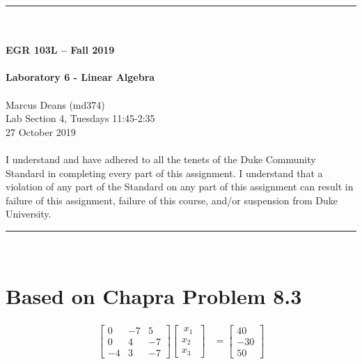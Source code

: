 \documentclass{article}
\begin{document}
\begin{center}
\rule{6.5in}{0.5mm}\\~\\
\textbf{\large EGR 103L -- Fall 2019}\\~\\
\textbf{\huge Laboratory 6 - Linear Algebra}\\~\\
Marcus Deans (md374)\\
Lab Section 4, Tuesdays 11:45-2:35\\
27 October 2019\\~\\
{\small I understand and have adhered to all the tenets of the Duke
  Community Standard in completing every part of this assignment.  I
  understand that a violation of any part of the Standard on any part
  of this assignment can result in failure of this assignment, failure
  of this course, and/or suspension from Duke University.} 
\rule{6.5in}{0.5mm}\\
\end{center}
\tableofcontents
\listoffigures
\pagebreak
\section{Based on Chapra Problem 8.3}
\begin{align*}
\begin{bmatrix}
 0 & -7 & 5\\
 0 & 4 & -7\\
 -4 & 3 & -7
\end{bmatrix}
\begin{bmatrix}
~x_1~ \\ x_2 \\ x_3
\end{bmatrix}&=
\begin{bmatrix}
40 \\ -30 \\ 50 
\end{bmatrix}
\end{align*}
\end{document}
